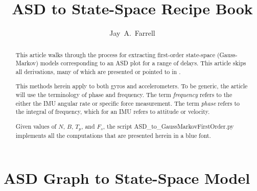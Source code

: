 \documentclass[letter,twocolumn]{article}
\begin{document}
	\title{ASD to State-Space Recipe Book}
\author{Jay~A.~Farrell}
\maketitle

\begin{abstract}
This article walks through the process for extracting first-order state-space (Gauss-Markov) models corresponding to an ASD plot for a range of delays.
This article skips all derivations, many of which are presented or pointed to in \cite{CSM_IMU}.

This methods herein apply to both gyros and accelerometers. 
To be generic, the article will use the terminology of phase and frequency. 
The term {\em frequency} refers to the either the IMU angular rate or specific force measurement.
The term {\em phase} refers to the integral of frequency, which for an IMU refers to attitude or velocity. 

Given values of $N$, $B$, $T_p$, and $F_s$, the script ASD\_to\_GaussMarkovFirstOrder.py implements all the computations that are presented herein in a \blue blue \black font.  
\end{abstract}

\section{ASD Graph to State-Space Model}
\end{document}

